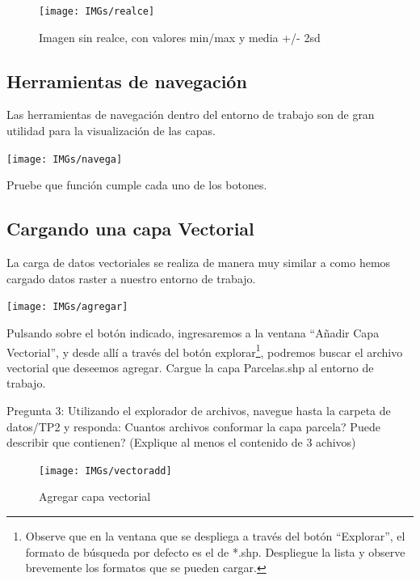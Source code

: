 \documentclass[onecolumn]{article}
\begin{document}
\begin{figure}
	\centering
	\texttt{[image: IMGs/realce]}
	\caption{Imagen sin realce, con valores min/max y media +/- 2sd}
	\label{fig:interfaz}
\end{figure}

\subsection{Herramientas de navegación}

Las herramientas de navegación dentro del entorno de trabajo son de gran utilidad para la visualización de las capas. 

\begin{center}
	\texttt{[image: IMGs/navega]}
\end{center}

Pruebe que función cumple cada uno de los botones.

\subsection{Cargando una capa Vectorial}

La carga de datos vectoriales se realiza de manera muy similar a como hemos cargado datos raster a nuestro entorno de trabajo.

\begin{center}
	\texttt{[image: IMGs/agregar]}
\end{center}

Pulsando sobre el botón indicado, ingresaremos a la ventana “Añadir Capa Vectorial”, y desde allí a través del botón explorar\footnote{Observe que en la ventana que se despliega a través del botón “Explorar”, el formato de búsqueda por defecto es el de  *.shp. Despliegue la lista y observe brevemente los formatos que se pueden cargar.}, podremos buscar el archivo vectorial que deseemos agregar. 
Cargue la capa Parcelas.shp al entorno de trabajo. 

\begin{mdframed}[]
	Pregunta 3: Utilizando el explorador de archivos, navegue hasta la carpeta de datos/TP2 y responda: Cuantos archivos conformar la capa parcela? Puede describir que contienen? (Explique al menos el contenido de 3 achivos)
\end{mdframed}


\begin{figure}[h]
	\centering
	\texttt{[image: IMGs/vectoradd]}
	\caption{Agregar capa vectorial}
	\label{fig:interfaz}
\end{figure}
\end{document}

